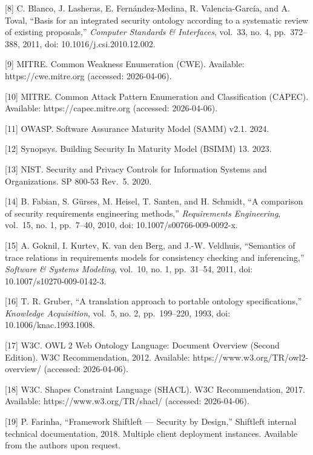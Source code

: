 \documentclass[
]{article}
\begin{document}
{[}8{]} C. Blanco, J. Lasheras, E. Fernández-Medina, R. Valencia-García,
and A. Toval, ``Basis for an integrated security ontology according to a
systematic review of existing proposals,'' \emph{Computer Standards \&
Interfaces}, vol.~33, no. 4, pp.~372--388, 2011, doi:
10.1016/j.csi.2010.12.002.

{[}9{]} MITRE. Common Weakness Enumeration (CWE). Available:
https://cwe.mitre.org (accessed: 2026-04-06).

{[}10{]} MITRE. Common Attack Pattern Enumeration and Classification
(CAPEC). Available: https://capec.mitre.org (accessed: 2026-04-06).

{[}11{]} OWASP. Software Assurance Maturity Model (SAMM) v2.1. 2024.

{[}12{]} Synopsys. Building Security In Maturity Model (BSIMM) 13. 2023.

{[}13{]} NIST. Security and Privacy Controls for Information Systems and
Organizations. SP 800-53 Rev.~5. 2020.

{[}14{]} B. Fabian, S. Gürses, M. Heisel, T. Santen, and H. Schmidt, ``A
comparison of security requirements engineering methods,''
\emph{Requirements Engineering}, vol.~15, no. 1, pp.~7--40, 2010, doi:
10.1007/s00766-009-0092-x.

{[}15{]} A. Goknil, I. Kurtev, K. van den Berg, and J.-W. Veldhuis,
``Semantics of trace relations in requirements models for consistency
checking and inferencing,'' \emph{Software \& Systems Modeling},
vol.~10, no. 1, pp.~31--54, 2011, doi: 10.1007/s10270-009-0142-3.

{[}16{]} T. R. Gruber, ``A translation approach to portable ontology
specifications,'' \emph{Knowledge Acquisition}, vol.~5, no. 2,
pp.~199--220, 1993, doi: 10.1006/knac.1993.1008.

{[}17{]} W3C. OWL 2 Web Ontology Language: Document Overview (Second
Edition). W3C Recommendation, 2012. Available:
https://www.w3.org/TR/owl2-overview/ (accessed: 2026-04-06).

{[}18{]} W3C. Shapes Constraint Language (SHACL). W3C Recommendation,
2017. Available: https://www.w3.org/TR/shacl/ (accessed: 2026-04-06).

{[}19{]} P. Farinha, ``Framework Shiftleft --- Security by Design,''
Shiftleft internal technical documentation, 2018. Multiple client
deployment instances. Available from the authors upon request.
\end{document}
